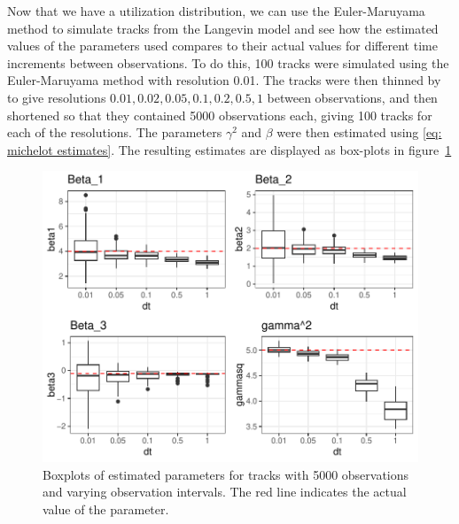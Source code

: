 Now that we have a utilization distribution, we can use the Euler-Maruyama method to simulate tracks from the Langevin model and see how the estimated values of the parameters used compares to their actual values for different time increments between observations. To do this, 100 tracks were simulated using the Euler-Maruyama method with resolution 0.01. The tracks were then thinned by to give resolutions $0.01, 0.02, 0.05, 0.1, 0.2, 0.5, 1$ between observations, and then shortened so that they contained 5000 observations each, giving 100 tracks for each of the resolutions. The parameters $\gamma^2$ and $\beta$ were then estimated using \eqref{eq: michelot estimates}. The resulting estimates are displayed as box-plots in figure~\ref{fig:EM_thin_boxplot}


\begin{figure}[H]
    \centering
    \includegraphics[width=\linewidth]{Images/ch3/varying dt EM boxplot.pdf}
    \caption[example 1 covariates]{Boxplots of estimated parameters for tracks with 5000 observations and varying observation intervals. The red line indicates the actual value of the parameter.}
    \label{fig:EM_thin_boxplot}
\end{figure}


